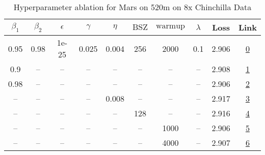 \begin{table}[H]
\centering
\caption{Hyperparameter ablation for Mars on 520m on 8x Chinchilla Data}
\label{tab:ablation_mars_520m_8}
\begin{tabular}{cccccccccc}
\toprule
$\beta_1$ & $\beta_2$ & $\epsilon$ & $\gamma$ & $\eta$ & $\mathrm{BSZ}$ & $\mathrm{warmup}$ & $\lambda$ & Loss & Link \\
\midrule
0.95 & 0.98 & 1e-25 & 0.025 & 0.004 & 256 & 2000 & 0.1 & 2.906 & \href{https://wandb.ai/stanford-mercury/optimizer-scaling/runs/sweep-520m-85B-mars995e4flr0.004-wd0.1-minlr0-warmup2000-b10.95--18e62c}{0} \\
\midrule
0.9 & -- & -- & -- & -- & -- & -- & -- & 2.908 & \href{https://wandb.ai/stanford-mercury/optimizer-scaling/runs/sweep-520m-85B-mars277fd9lr0.004-wd0.1-minlr0-warmup2000-b10.9-b-4a0179}{1} \\
0.98 & -- & -- & -- & -- & -- & -- & -- & 2.906 & \href{https://wandb.ai/stanford-mercury/optimizer-scaling/runs/sweep-520m-85B-marsb6a610lr0.004-wd0.1-minlr0-warmup2000-b10.98--b56c02}{2} \\
-- & -- & -- & -- & 0.008 & -- & -- & -- & 2.917 & \href{https://wandb.ai/stanford-mercury/optimizer-scaling/runs/sweep-520m-85B-marsf698a0lr0.008-wd0.1-minlr0-warmup2000-b10.95--ce7d2d}{3} \\
-- & -- & -- & -- & -- & 128 & -- & -- & 2.916 & \href{https://wandb.ai/stanford-mercury/optimizer-scaling/runs/sweep-520m-85B-marse53488lr0.004-wd0.1-minlr0-warmup2000-b10.95--77623f}{4} \\
-- & -- & -- & -- & -- & -- & 1000 & -- & 2.906 & \href{https://wandb.ai/stanford-mercury/optimizer-scaling/runs/sweep-520m-85B-mars1c70a7lr0.004-wd0.1-minlr0-warmup1000-b10.95--ef2ded}{5} \\
-- & -- & -- & -- & -- & -- & 4000 & -- & 2.907 & \href{https://wandb.ai/stanford-mercury/optimizer-scaling/runs/sweep-520m-85B-mars8bc425lr0.004-wd0.1-minlr0-warmup4000-b10.95--65ac2e}{6} \\
\bottomrule
\end{tabular}
\end{table}

